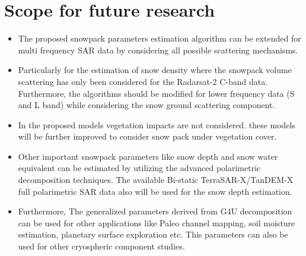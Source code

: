 \section{Scope for future research}
\begin{itemize}
	\item The proposed snowpack parameters estimation algorithm can be extended for multi frequency SAR data by considering all possible scattering mechanisms.
	\item Particularly for the estimation of snow density where the snowpack volume scattering has only been considered for the Radarsat-2 C-band data. Furthermore, the algorithms should be modified for lower frequency data (S and L band) while considering the snow ground scattering component.
	\item In the proposed models vegetation impacts are not considered. these models will be further improved to consider snow pack under vegetation cover. 
	\item Other important snowpack parameters like snow depth and snow water equivalent can be estimated by utilizing the advanced polarimetric decomposition techniques. The available Bi-static TerraSAR-X/TanDEM-X full polarimetric SAR data also will be used for the snow depth estimation. 
	\item Furthermore, The generalized parameters derived from G4U decomposition can be used for other applications like Paleo channel mapping, soil moisture estimation, planetary surface exploration etc. This parameters can also be used for other cryospheric component studies. 
\end{itemize}
  




 

